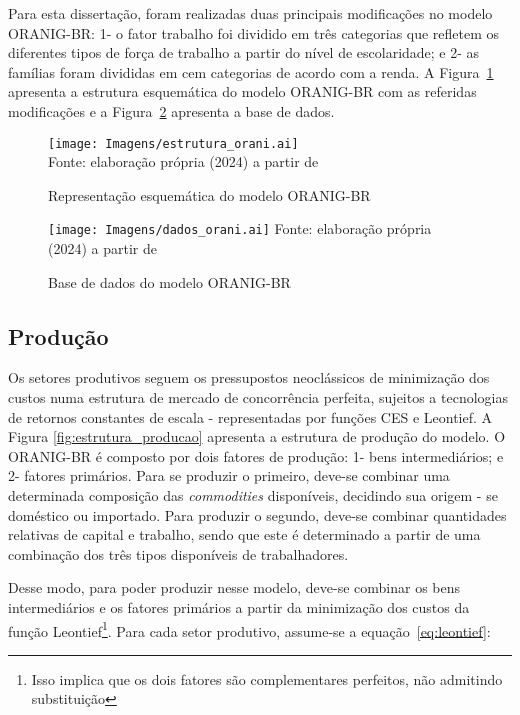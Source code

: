 Para esta dissertação, foram realizadas duas principais modificações no modelo ORANIG-BR: 1- o fator trabalho foi dividido em três categorias que refletem os diferentes tipos de força de trabalho a partir do nível de escolaridade; e 2- as famílias foram divididas em cem categorias de acordo com a renda. A Figura~\ref{fig:estrutura_orani} apresenta a estrutura esquemática do modelo ORANIG-BR com as referidas modificações e a Figura~\ref{fig:dados_orani} apresenta a base de dados.


\begin{landscape}
	\begin{figure}
		\centering
		\caption{Representação esquemática do modelo ORANIG-BR} \label{fig:estrutura_orani}
		\texttt{[image: Imagens/estrutura\_orani.ai]}
		\footnotesize \\
		Fonte: elaboração própria (2024) a partir de \textcite{souza15}
	\end{figure}
\end{landscape}

\begin{figure}[H]
	\centering
	\caption{Base de dados do modelo ORANIG-BR} \label{fig:dados_orani}
	\texttt{[image: Imagens/dados\_orani.ai]}
	\footnotesize
	Fonte: elaboração própria (2024) a partir de \textcite{horridge00}
\end{figure}


\subsection{Produção} \label{subsec:producao}

Os setores produtivos seguem os pressupostos neoclássicos de minimização dos custos numa estrutura de mercado de concorrência perfeita, sujeitos a tecnologias de retornos constantes de escala - representadas por funções CES e Leontief. A Figura \ref{fig:estrutura_producao} apresenta a estrutura de produção do modelo. O ORANIG-BR é composto por dois fatores de produção: 1- bens intermediários; e 2- fatores primários. Para se produzir o primeiro, deve-se combinar uma determinada composição das \textit{commodities} disponíveis, decidindo sua origem - se doméstico ou importado. Para produzir o segundo, deve-se combinar quantidades relativas de capital e trabalho, sendo que este é determinado a partir de uma combinação dos três tipos disponíveis de trabalhadores.

Desse modo, para poder produzir nesse modelo, deve-se combinar os bens intermediários e os fatores primários a partir da minimização dos custos da função Leontief\footnote{Isso implica que os dois fatores são complementares perfeitos, não admitindo substituição}. Para cada setor produtivo, assume-se a equação~\eqref{eq:leontief}:

